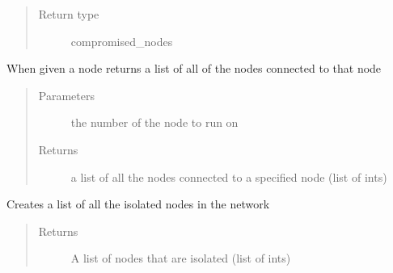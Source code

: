 \documentclass[letterpaper,10pt,english]{sphinxmanual}
\begin{document}
\begin{fulllineitems}
\begin{fulllineitems}
\begin{quote}
\begin{description}
\item[{Return type}] \leavevmode
\sphinxAtStartPar
compromised\_nodes

\end{description}\end{quote}

\end{fulllineitems}


\begin{fulllineitems}
\label{\detokenize{source/yawning_titan.envs.specific.core:yawning_titan.envs.specific.core.nsa_node_collection.NodeCollection.get_connected_nodes}}
\sphinxAtStartPar
When given a node returns a list of all of the nodes connected to that node
\begin{quote}\begin{description}
\item[{Parameters}] \leavevmode
\sphinxAtStartPar
{} \textendash{} the number of the node to run on

\item[{Returns}] \leavevmode
\sphinxAtStartPar
a list of all the nodes connected to a specified node (list of ints)

\end{description}\end{quote}

\end{fulllineitems}


\begin{fulllineitems}
\label{\detokenize{source/yawning_titan.envs.specific.core:yawning_titan.envs.specific.core.nsa_node_collection.NodeCollection.get_isolated_nodes}}
\sphinxAtStartPar
Creates a list of all the isolated nodes in the network
\begin{quote}\begin{description}
\item[{Returns}] \leavevmode
\sphinxAtStartPar
A list of nodes that are isolated (list of ints)


\end{description}
\end{quote}
\end{fulllineitems}
\end{fulllineitems}
\end{document}
